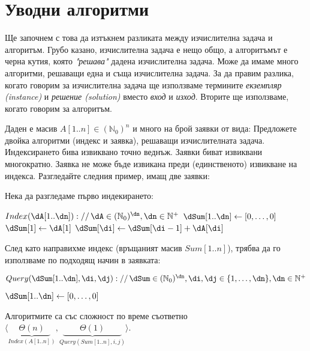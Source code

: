 \section{Уводни алгоритми}

Ще започнем с това да изтъкнем разликата между изчислителна задача и алгоритъм. Грубо казано, изчислителна задача е нещо общо, а алгоритъмът е черна кутия, която \emph{"решава"} дадена изчислителна задача. Може да имаме много алгоритми, решаващи една и съща изчислителна задача. За да правим разлика, когато говорим за изчислителна задача ще използваме термините \emph{екземпляр (instance)} и \emph{решение (solution)} вместо \emph{вход} и \emph{изход}. Вторите ще използваме, когато говорим за алгоритъм.\\

\begin{problem}
	Даден е масив $A[1..n]\in(\mathbb{N}_0)^n$ и много на брой заявки от вида:
	Предложете двойка алгоритми (индекс и заявка), решаващи изчислителната задача. Индексирането бива извиквано точно веднъж. Заявки биват извиквани многократно. Заявка не може бъде извикана преди (единственото) извикване на индекса. Разгледайте следния пример, имащ две заявки:
\end{problem}

\begin{solution}
	Нека да разгледаме първо индекирането:
	\begin{pseudocode}
		
		$Index(\dA[1..\dn])://\,\dA\in(\mathbb{N}_0)^{\dn},\dn\in\mathbb{N}^+$
		\Mybegin
		{
			$\dSum[1..\dn]\leftarrow[0,\dots,0]$\;
			$\dSum[1]\leftarrow\dA[1]$\;
			{
				$\dSum[\di]\leftarrow\dSum[\di-1]+\dA[\di]$\;
			}
			\KwRet{$\dSum[1..\dn]$}\;
		}
	\end{pseudocode}
	След като направихме индекс (връщаният масив $Sum[1..n]$), трябва да го използваме по подходящ начин в заявката:
	\begin{pseudocode}
		\SetKwData{dn}{n}
		\SetKwData{dSum}{Sum}
		\SetKwData{di}{i}
		\SetKwData{dj}{j}
		
		$Query(\dSum[1..\dn],\di,\dj)://\,\dSum\in(\mathbb{N}_0)^{\dn},\di,\dj\in\{1,\dots,\dn\},\dn\in\mathbb{N}^+$
		\Mybegin
		{
			$\dSum[1..\dn]\leftarrow[0,\dots,0]$\;
			
			\If{$\di<1$ \Or $\dj>\dn$}{\KwRet{$-1$};}
			\If{$\di>\dj$}{\KwRet{$0$};}
			\If{$\di=1$}{\KwRet{$\dSum[\dj]$};}
			
			\KwRet{$\dSum[\dj]-\dSum[\di-1]$}\;
		}
	\end{pseudocode}
	Алгоритмите са със сложност по време съответно $\langle\underbrace{\ \ \ \Theta(n)\ \ \ }_{Index(A[1..n])},\underbrace{\quad\quad\Theta(1)\quad\quad}_{Query(Sum[1..n],i,j)}\rangle$.
\end{solution}\vspace{0.5cm}

